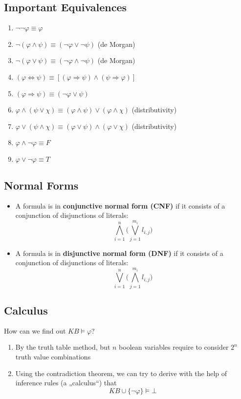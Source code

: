 \documentclass[conference, a4paper]{styles/acmsiggraph}
\begin{document}
    \subsection{Important Equivalences}
        \begin{enumerate}
            \item $\lnot\lnot \varphi \equiv \varphi$
            \item $\lnot (\varphi \land \psi) \equiv (\lnot \varphi \vee \lnot \psi)$ (de Morgan)
            \item $\lnot (\varphi \vee \psi) \equiv (\lnot \varphi \land \lnot \psi)$ (de Morgan)
            \item $(\varphi \Leftrightarrow \psi) \equiv [(\varphi \Rightarrow \psi) \land (\psi \Rightarrow \varphi)]$
            \item $(\varphi \Rightarrow \psi) \equiv (\lnot \varphi \vee \psi)$
            \item $\varphi \land (\psi \vee \chi) \equiv (\varphi \land \psi) \vee (\varphi \land \chi)$ (distributivity)
            \item $\varphi \vee (\psi \land \chi) \equiv (\varphi \vee \psi) \land (\varphi \vee \chi)$ (distributivity)
            \item $\varphi \land \lnot \varphi \equiv F$
            \item $\varphi \vee \lnot \varphi \equiv T$
        \end{enumerate}
    
    
    \subsection{Normal Forms}
        \begin{itemize}
            \item A formula is in \textbf{conjunctive normal form (CNF)} if it consists of a conjunction of disjunctions of literals:
             $$\bigwedge\limits_{i=1}^n \Biggl(\bigvee\limits_{j=1}^{m_i} l_{i,j} \Biggr)$$
             \item A formula is in \textbf{disjunctive normal form (DNF)} if it consists of a conjunction of disjunctions of literals:
             $$\bigvee\limits_{i=1}^n \Biggl(\bigwedge\limits_{j=1}^{m_i} l_{i,j} \Biggr)$$
        \end{itemize}
    
    
    \subsection{Calculus}
        How can we find out $KB \vDash \varphi$?
        \begin{enumerate}
            \item By the truth table method, but $n$ boolean variables require to consider $2^n$ truth value combinations
            \item Using the contradiction theorem, we can try to derive with the help of inference rules (a „calculus“) that
                $$KB \cup \{ \lnot \varphi \} \vDash \bot$$
        \end{enumerate}
    
\end{document}

